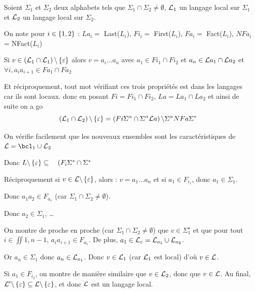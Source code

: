     \begin{nproof}
        Soient $\Sigma_1$ et $\Sigma_2$ deux alphabets tels que $\Sigma_1 \cap \Sigma_2 \neq \emptyset$, $\mathcal{L}_1$ un langage local sur $\Sigma_1$ et $\mathcal{L}_2$ un langage local sur $\Sigma_2$.
        
        On note pour \(i\in \left\{1, 2\right\}\) : \(La_i =\) Last(\(L_i\)), \(Fi_i =\) First(\(L_i\)), \(Fa_i =\) Fact(\(L_i\)), \(NFa_i\) = NFact(\(L_i\))

        \begin{psse}
            \item Si \(v \in \left(\mathcal{L}_1\cap\mathcal{L}_1\right)\backslash\left\{\varepsilon\right\}\) alors \(v = a_i \hdots a_n\) avec \(a_1 \in Fi_1 \cap Fi_2\) et \(a_n \in \mathcal{L} a_1 \cap \mathcal{L} a_2\) et \(\forall i, a_i a_{i+1} \in Fa_1 \cap Fa_2\)

            Et réciproquement, tout mot vérifiant ces trois propriétés est dans les langages car ils sont locaux. donc en posant \(Fi = Fi_1 \cap Fi_2\), \(La = La_1 \cap La_2\) et ainsi de suite on a go 
            \[ \left(\mathcal{L}_1\cap \mathcal{L}_2 \right) \backslash \left\{\varepsilon\right\} = \left(Fi\Sigma^{\alpha} \cap \Sigma^{\alpha} \mathcal{L} a\right) \backslash \Sigma^{\alpha} NFa \Sigma^*\]

            On vérifie facilement que les nouveaux ensembles sont les caractéristiques de \(\bcL=\bcl_1\cup\bcL_2\)
            
            Donc $L \backslash \left\{\varepsilon\right\} \subseteq \quad (F_i \Sigma^* \cap \Sigma^* $

            \item Réciproquement  si \(v\in \mathcal{L}\backslash\left\{\varepsilon\right\}\), alors :
            $v = a_1\dots a_n$ et si $a_1 \in F_{i_1}$, donc $a_1 \in \Sigma_1$.
            
            Donc $a_1a_2 \in F_{a_1}$ (car $\Sigma_1 \cap \Sigma_2 \neq \emptyset$).
            
            Donc $a_2 \in \Sigma_1$, \dots
            
            On montre de proche en proche (car $\Sigma_1 \cap \Sigma_2 \neq \emptyset$) que $v \in \Sigma_1^\star$ et que pour tout $i \in \iint{1, n-1}$, $a_ia_{i+1} \in F_{a_1}$. De plus, $a_1 \in \mathcal{L}_\varepsilon  = \mathcal{L}_{a_1} \cup \mathcal{L}_{a_2}$.
            
            Or $a_n \in \Sigma_1$ donc $a_n \in \mathcal{L}_{a_1}$. Donc $v \in \mathcal{L}_1$ (car $\mathcal{L}_1$ est local) d'où $v \in \mathcal{L}$.
            
            Si $a_1 \in F_{i_2}$, on montre de manière similaire que $v \in \mathcal{L}_2$, donc que $v \in \mathcal{L}$. Au final, $\mathcal{L}' \backslash \left\{\varepsilon\right\} \subseteq \mathcal{L} \backslash \left\{\varepsilon\right\}$, et donc $\mathcal{L}$ est un langage local.
            

\end{psse}
\end{nproof}
